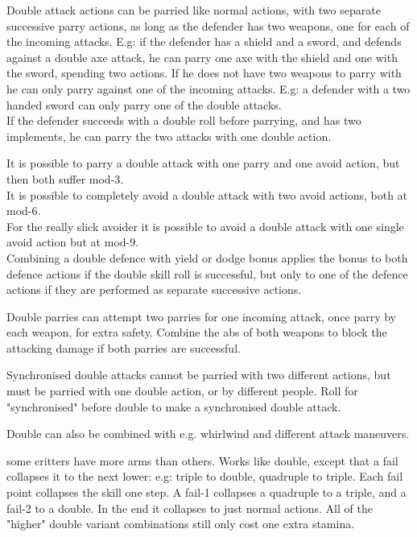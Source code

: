 Double attack actions can be parried like normal actions, with two separate successive parry actions, as long as the defender has two weapons, one for each of the incoming attacks. E.g: if the defender has a shield and a sword, and defends against a double axe attack, he can parry one axe with the shield and one with the sword, spending two actions. If he does not have two weapons to parry with he can only parry against one of the incoming attacks. E.g: a defender with a two handed sword can only parry one of the double attacks.\\
If the defender succeeds with a double roll before parrying, and has two implements, he can parry the two attacks with one double action.

It is possible to parry a double attack with one parry and one avoid action, but then both suffer mod-3.\\
It is possible to completely avoid a double attack with two avoid actions, both at mod-6.\\
For the really slick avoider it is possible to avoid a double attack with one single avoid action but at mod-9.\\

Combining a double defence with yield or dodge bonus applies the bonus to both defence actions if the double skill roll is successful, but only to one of the defence actions if they are performed as separate successive actions.

Double parries can attempt two parries for one incoming attack, once parry by each weapon, for extra safety. Combine the abs of both weapons to block the attacking damage if both parries are successful.

Synchronised double attacks cannot be parried with two different actions, but must be parried with one double action, or by different people. Roll for "synchronised" before double to make a synchronised double attack.

Double can also be combined with e.g. whirlwind and different attack maneuvers.


 some critters have more arms than others. Works like double, except that a fail collapses it to the next lower: e.g: triple to double, quadruple to triple. Each fail point collapses the skill one step. A fail-1 collapses a quadruple to a triple, and a fail-2 to a double. In the end it collapses to just normal actions. All of the "higher" double variant combinations still only cost one extra stamina.

